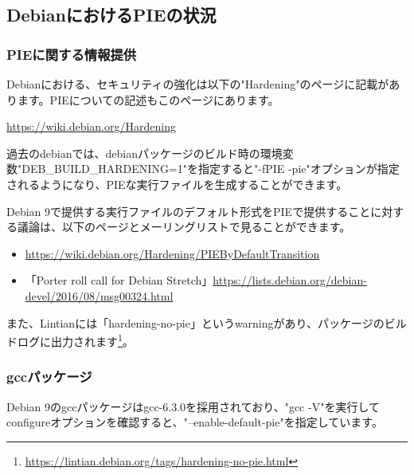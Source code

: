 \documentclass[mingoth,a4paper]{jsarticle}
\begin{document}
\subsection{DebianにおけるPIEの状況}

\subsubsection{PIEに関する情報提供}

Debianにおける、セキュリティの強化は以下の"Hardening"のページに記載があります。PIEについての記述もこのページにあります。


\url{https://wiki.debian.org/Hardening}


過去のdebianでは、debianパッケージのビルド時の環境変数"DEB\_BUILD\_HARDENING=1"を指定すると"-fPIE -pie"オプションが指定されるようになり、PIEな実行ファイルを生成することができます。


Debian 9で提供する実行ファイルのデフォルト形式をPIEで提供することに対する議論は、以下のページとメーリングリストで見ることができます。

\begin{itemize}
  \item \url{https://wiki.debian.org/Hardening/PIEByDefaultTransition}
  \item 「Porter roll call for Debian Stretch」\url{https://lists.debian.org/debian-devel/2016/08/msg00324.html}
\end{itemize}


また、Lintianには「hardening-no-pie」というwarningがあり、パッケージのビルドログに出力されます\footnote{\url{https://lintian.debian.org/tags/hardening-no-pie.html}}。


\subsubsection{gccパッケージ}

Debian 9のgccパッケージはgcc-6.3.0を採用されており、"gcc -V"を実行してconfigureオプションを確認すると、"--enable-default-pie"を指定しています。
\end{document}
